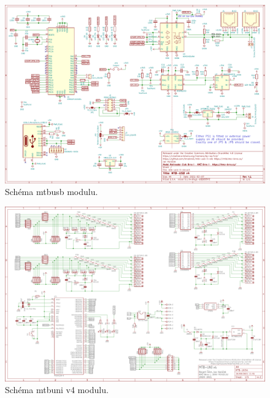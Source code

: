 \vspace{-2em}

\begin{figure}[H]
\includegraphics[angle=90,width=\textwidth]{data/mtb-usb-4-ele.pdf}
\caption{Schéma \gls{mtbusb} modulu.}
\label{fig:mtb-usb-sch}
\end{figure}

\begin{figure}[ht]
\includegraphics[angle=90,width=\textwidth]{data/mtb-uni-4-ele.pdf}
\caption{Schéma \gls{mtbuni} v4 modulu.}
\label{fig:mtb-uni-4-sch}
\end{figure}


